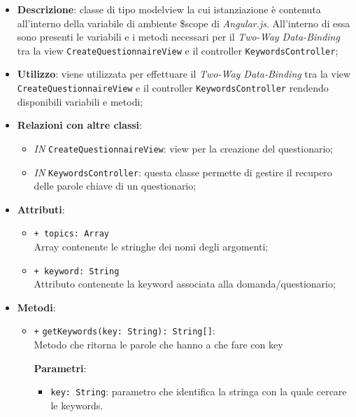 				\begin{itemize}
					\item \textbf{Descrizione}: classe di tipo modelview la cui istanziazione è contenuta all'interno della variabile di ambiente \$scope di \textit{Angular.js}. All'interno di essa sono presenti le variabili e i metodi necessari per il \textit{Two-Way Data-Binding} tra la view \texttt{CreateQuestionnaireView} e il controller \texttt{KeywordsController};
					\item \textbf{Utilizzo}: viene utilizzata per effettuare il \textit{Two-Way Data-Binding} tra la view \texttt{CreateQuestionnaireView} e il controller \texttt{KeywordsController} rendendo disponibili variabili e metodi;
					\item \textbf{Relazioni con altre classi}: 
					\begin{itemize}
						\item \textit{IN} \texttt{CreateQuestionnaireView}: view per la creazione del questionario; 
						\item \textit{IN} \texttt{KeywordsController}: questa classe permette di gestire il recupero delle parole chiave di un questionario;
					\end{itemize}
					\item \textbf{Attributi}: 
					\begin{itemize}
						\item \texttt{+ topics: Array} \\ Array contenente le stringhe dei nomi degli argomenti;
						\item \texttt{+ keyword: String} \\ Attributo contenente la keyword associata alla domanda/questionario;
					\end{itemize}
					\item \textbf{Metodi}: 
					\begin{itemize}
						\item \texttt{+} \texttt{getKeywords(key: String): String[]}: \\ Metodo che ritorna le parole che hanno a che fare con key
						
						\textbf{Parametri}:
						\begin{itemize}
							\item \texttt{key: String}: parametro che identifica la stringa con la quale cercare le keywords. 
						\end{itemize}
					\end{itemize}
				\end{itemize}
				
					